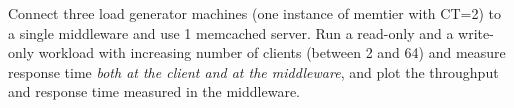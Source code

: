 

Connect three load generator machines (one instance of memtier with CT=2) to a single middleware and use 1 memcached server. Run a read-only and a write-only workload with increasing number of clients (between 2 and 64) and measure response time \emph{both at the client and at the middleware}, and plot the throughput and response time measured in the middleware.

